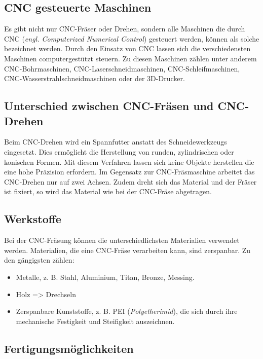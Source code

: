 \subsection{CNC gesteuerte Maschinen}
Es gibt nicht nur CNC-Fräser oder Drehen, sondern alle Maschinen die durch CNC (\emph{engl. Computerized Numerical Control}) gesteuert werden, können als solche bezeichnet werden. Durch den Einsatz von CNC lassen sich die verschiedensten Maschinen computergestützt steuern. Zu diesen Maschinen zählen unter anderem CNC-Bohrmaschinen,  CNC-Laserschneidmaschinen, CNC-Schleifmaschinen, CNC-Wasserstrahlschneidmaschinen oder der 3D-Drucker. \\
\cite{Arten_CNC_Maschinen}

\subsection{Unterschied zwischen CNC-Fräsen und CNC-Drehen}
Beim CNC-Drehen wird ein Spannfutter anstatt des Schneidewerkzeugs eingesetzt. Dies ermöglicht die Herstellung von runden, zylindrischen oder konischen Formen. Mit diesem Verfahren lassen sich keine Objekte herstellen die eine hohe Präzision erfordern. Im Gegensatz zur CNC-Fräsmaschine arbeitet das CNC-Drehen nur auf zwei Achsen. Zudem dreht sich das Material und der Fräser ist fixiert, so wird das Material wie bei der CNC-Fräse abgetragen. \\
\cite{CNC-Drehen_Unterschied}


\subsection{Werkstoffe}
Bei der CNC-Fräsung können die unterschiedlichsten Materialien verwendet werden. Materialien, die eine CNC-Fräse verarbeiten kann, sind zerspanbar. Zu den gängigsten zählen:

\begin{itemize}
	\item Metalle, z. B. Stahl, Aluminium, Titan, Bronze, Messing.
	\item Holz => Drechseln
	\item Zerspanbare Kunststoffe, z. B. PEI (\emph{Polyetherimid}), die sich durch ihre mechanische Festigkeit und Steifigkeit auszeichnen.
\end{itemize}
\cite{CNC-Fraesen_3} \cite{PEIZerspannung} \cite{PEIKunststoff-Polyetherimid}

\subsection{Fertigungsmöglichkeiten}

